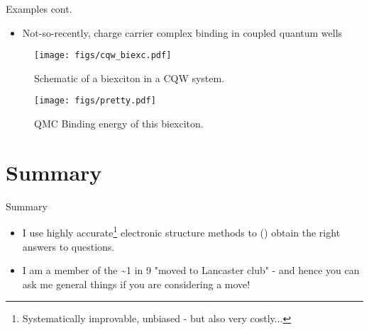 \documentclass[12pt, pdf, hyperref={draft}, usenames, dvipsnames]{beamer}
\newcommand{\blue}[1]{{\bf\color{NavyBlue}{#1}}}
\newcommand{\green}[1]{{\bf\color{ForestGreen}{#1}}}
\begin{document}
\begin{frame}{Examples cont.}
  \begin{itemize}
    \item Not-so-recently, charge carrier complex binding in coupled quantum
    wells
  \end{itemize}
  \begin{minipage}{0.5\textwidth}
  \centering
  \begin{figure}[H]
    \centering
    \texttt{[image: figs/cqw\_biexc.pdf]}
    \caption{Schematic of a biexciton in a CQW system.}
    \label{fig:biexc}
  \end{figure}
  \end{minipage}%
  \hfill
  \begin{minipage}{0.5\textwidth}
  \centering
  \begin{figure}[H]
    \centering
    \texttt{[image: figs/pretty.pdf]}
    \caption{QMC Binding energy of this biexciton.}
    \label{fig:be_binding}
  \end{figure}
  \end{minipage}

\end{frame}

\section{Summary}
\begin{frame}{Summary}
  \begin{itemize}
    \item I use highly accurate\footnote{Systematically
    improvable, unbiased - but also very costly...} electronic structure
    methods to (\green{hopefully}) obtain the right answers to \blue{important}
    questions.
    \item I am a member of the \textasciitilde 1 in 9 "moved to Lancaster club"
    - and hence you can ask me general things if you are considering a move!
  \end{itemize}
\end{frame}
\end{document}

